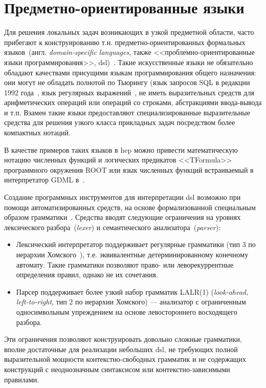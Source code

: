 \section{Предметно-ориентированные языки}

Для решения локальных задач возникающих в узкой предметной области,
часто прибегают к конструированию т.н. предметно-ориентированных
формальных языков~(англ. \emph{domain-specific languages}, также
<<проблемно-ориентированные языки
программирования>>, \acrshort{dsl})~\cite{DSL-Fowler2011}. Такие искусственные
языки не обязательно обладают качествами присущими языкам программирования
общего назначения: они могут не обладать полнотой по Тьюрингу (язык
запросов SQL в редакции 1992 года~\cite{ISO90751992}, язык
регулярных выражений~\cite{thompson1968programming},
не иметь выразительных средств для арифметических операций или операций со
строками, абстракциями ввода-вывода и т.п. Взамен такие языки
предоставляют специализированные выразительные средства для решения узкого
класса прикладных задач посредством более компактных нотаций.

В качестве примеров таких языков в \acrshort{hep} можно привести
математическую нотацию численных функций и логических предикатов
<<TFormula>> программного окружения ROOT \cite{ROOT-framework} или язык численных
функций встраиваемый в интерпретатор GDML в~\cite{Berra2011Geant4SO}.

Создание программных инструментов для интерпретации \acrshort{dsl}
возможно при помощи автоматизированных средств, на основе
формализованной специальным образом грамматики~\cite{alfred2007compilers}.
Средства вводят следующие ограничения на уровнях лексического
разбора~(\emph{lexer}) и семантического анализатора~(\emph{parser}):
\begin{itemize}
    \item Лексический интерпретатор поддерживает регулярные
    грамматики (тип 3 по иерархии Хомского~\cite{chomsky1956three}),
    т.е. эквивалентные детерминированному конечному автомату. Такие грамматики
    позволяют право- или леворекуррентные определения правил, однако
    не их сочетания.
    \item Парсер поддерживает более узкий набор грамматик  LALR(1)
    (\emph{look-ahead, left-to-right}, тип 2 по иерархии Хомского) ---
    анализатор с ограниченным односимвольным упреждением на основе
    левостороннего восходящего разбора.
\end{itemize}
Эти ограничения позволяют конструировать довольно сложные
грамматики, вполне достаточные для реализации небольших \acrshort{dsl},
не требующих полной выразительной мощности контекстно-свободных
грамматик и не содержащих конструкций с неоднозначным синтаксисом
или контекстно-зависимыми правилами.

